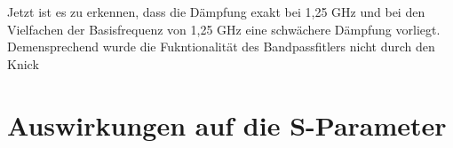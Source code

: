     Jetzt ist es zu erkennen, dass die Dämpfung exakt bei 1,25 GHz und bei den Vielfachen der Basisfrequenz von 1,25 GHz eine schwächere Dämpfung vorliegt. Demensprechend wurde die Fukntionalität des Bandpassfitlers nicht durch den Knick 
\section{Auswirkungen auf die S-Parameter}
